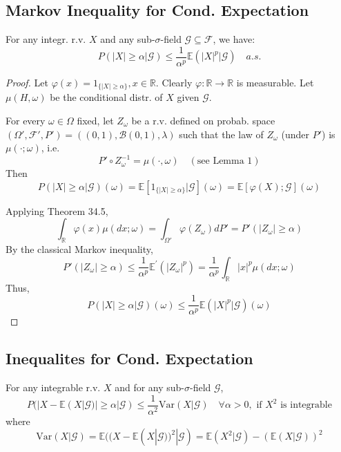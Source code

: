 \subsection{Markov Inequality for Cond. Expectation}

\begin{lemma}
For any integr. r.v. \(X\) and any sub-\(\sigma\)-field \(\mathcal{G} \subseteq \mathcal{F}\), we have:
\[
P(|X| \geq \alpha | \mathcal{G}) \leq \frac{1}{\alpha^p} \mathbb{E}(|X|^p | \mathcal{G}) \quad a.s.
\]
\end{lemma}

\begin{proof}
Let \(\varphi(x) = 1_{\{|X| \geq \alpha\}}, x \in \mathbb{R}\). Clearly \(\varphi : \mathbb{R} \to \mathbb{R}\) is measurable. Let \(\mu(H,\omega)\) be the conditional distr. of \(X\) given \(\mathcal{G}\).

For every \(\omega \in \Omega\) fixed, let \(Z_\omega\) be a r.v. defined on probab. space \((\Omega', \mathcal{F}', P') = ((0,1), \mathcal{B}(0,1), \lambda)\) such that the law of \(Z_\omega\) (under \(P'\)) is \(\mu(\cdot; \omega)\), i.e. 
\[
P' \circ Z_\omega^{-1} = \mu(\cdot, \omega) \quad (\text{see Lemma 1})
\]
Then
\[
P(|X| \geq \alpha | \mathcal{G})(\omega) = \mathbb{E}\left[1_{\{|X| \geq \alpha\}} | \mathcal{G}\right](\omega) = \mathbb{E}[\varphi(X); \mathcal{G}](\omega)
\]

Applying Theorem 34.5,
\[
\int_{\mathbb{R}} \varphi(x) \mu(dx;\omega) = \int_{\Omega'} \varphi(Z_\omega) dP' = P'(|Z_\omega| \geq \alpha)
\]
By the classical Markov inequality,
\[
P'(|Z_\omega| \geq \alpha) \leq \frac{1}{\alpha^p} \mathbb{E}^{'}(|Z_\omega|^p) = \frac{1}{\alpha^p} \int_{\mathbb{R}} |x|^p \mu(dx;\omega)
\]
Thus,
\[
P(|X| \geq \alpha | \mathcal{G})(\omega) \leq \frac{1}{\alpha^p} \mathbb{E}(|X|^p | \mathcal{G})(\omega)
\]
\end{proof}
\subsection{Inequalites for Cond. Expectation}
\begin{corollary}
For any integrable r.v. \(X\) and for any sub-\(\sigma\)-field \(\mathcal{G}\),
\[
P(|X - \mathbb{E}(X|\mathcal{G})| \geq \alpha | \mathcal{G}) \leq \frac{1}{\alpha^2} \text{Var}(X|\mathcal{G}) \quad \forall \alpha > 0, \text{ if } X^2 \text{ is integrable}
\]
where
\[
\text{Var}(X|\mathcal{G}) = \mathbb{E}((X - \mathbb{E}(X|\mathcal{G}))^2 | \mathcal{G})
= \mathbb{E}(X^2|\mathcal{G}) - (\mathbb{E}(X|\mathcal{G}))^2
\]
\end{corollary}

